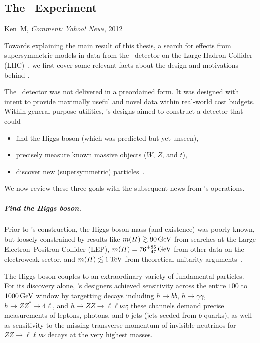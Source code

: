 \begin{singlespacing}
\chapter{The \atlas\ Experiment}
\label{chapter:experiment}
%
\begin{epigraphs}
%
{Ken~M,
\textit{Comment: Yahoo! News},
2012~\cite{kenm2012inner}}
\end{epigraphs}
\end{singlespacing}
\noindent
Towards explaining the main result of this thesis,
a search for effects from supersymmetric models
in data from the \atlas\ detector
on the Large Hadron Collider (LHC)~\cite{
atlas2022searches,
atlas2008experiment,
lhc2008machine
},
we first cover some relevant facts about the design and motivations
behind \atlas.

The \atlas\ detector was not delivered in a preordained form.
It was designed with intent to provide maximally useful and novel data within
real-world cost budgets.
Within general purpose utilities, \atlas's designs aimed to construct a
detector that could
\begin{itemize}
\item find the Higgs boson (which was predicted but yet unseen),
\item precisely measure known massive objects ($W$, $Z$, and $t$),
\item discover new (supersymmetric) particles~\cite{atlas1999design1}.
\end{itemize}
We now review these three goals with the subsequent news from \atlas's
operations.

\paragraph{Find the Higgs boson.}
Prior to \atlas's construction, the Higgs boson mass (and existence) was
poorly known, but loosely constrained by results like
$m(H) \gtrsim 90\,\eV[G]$ from searches at the
Large Electron–Positron Collider (LEP),
$m(H) = 76^{+85}_{-47}\,\eV[G]$ from other data on the electroweak sector,
and $m(H) \lesssim 1\,\eV[T]$ from theoretical unitarity arguments~\cite{
atlas1999design2,
ghinculov1998perturb,
lep1999ewk
}.

The Higgs boson couples to an extraordinary variety of fundamental particles.
For its discovery alone, \atlas's designers achieved sensitivity across the
entire $100$ to $1000\,\eV[G]$ window by targetting decays including
$h \to b\bar b$,
$h \to \gamma\gamma$,
$h \to ZZ^* \to 4\ell$, and
$h \to ZZ \to \ell\ell\nu\nu$;
these channels demand precise measurements of leptons, photons, and
$b$-jets (jets seeded from $b$ quarks), as well as sensitivity to the missing
transverse momentum of invisible neutrinos for $ZZ \to \ell\ell\nu\nu$ decays
at the very highest masses.

